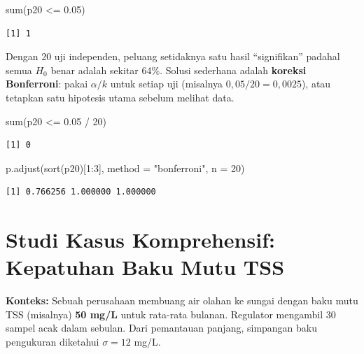 \documentclass[
  indonesian,
  letterpaper,
]{book}
\newenvironment{Shaded}{\begin{snugshade}}{\end{snugshade}}
\newcommand{\AttributeTok}[1]{\textcolor[rgb]{0.40,0.45,0.13}{#1}}
\newcommand{\DecValTok}[1]{\textcolor[rgb]{0.68,0.00,0.00}{#1}}
\newcommand{\FloatTok}[1]{\textcolor[rgb]{0.68,0.00,0.00}{#1}}
\newcommand{\FunctionTok}[1]{\textcolor[rgb]{0.28,0.35,0.67}{#1}}
\newcommand{\NormalTok}[1]{\textcolor[rgb]{0.00,0.23,0.31}{#1}}
\newcommand{\SpecialCharTok}[1]{\textcolor[rgb]{0.37,0.37,0.37}{#1}}
\newcommand{\StringTok}[1]{\textcolor[rgb]{0.13,0.47,0.30}{#1}}
\begin{document}
\begin{Shaded}
\begin{Highlighting}[]
\FunctionTok{sum}\NormalTok{(p20 }\SpecialCharTok{\textless{}=} \FloatTok{0.05}\NormalTok{)}
\end{Highlighting}
\end{Shaded}

\begin{verbatim}
[1] 1
\end{verbatim}

Dengan 20 uji independen, peluang setidaknya satu hasil ``signifikan''
padahal semua \(H_0\) benar adalah sekitar 64\%. Solusi sederhana adalah
\textbf{koreksi Bonferroni}: pakai \(\alpha/k\) untuk setiap uji
(misalnya \(0{,}05/20 = 0{,}0025\)), atau tetapkan satu hipotesis utama
sebelum melihat data.

\begin{Shaded}
\begin{Highlighting}[]
\FunctionTok{sum}\NormalTok{(p20 }\SpecialCharTok{\textless{}=} \FloatTok{0.05} \SpecialCharTok{/} \DecValTok{20}\NormalTok{)}
\end{Highlighting}
\end{Shaded}

\begin{verbatim}
[1] 0
\end{verbatim}

\begin{Shaded}
\begin{Highlighting}[]
\FunctionTok{p.adjust}\NormalTok{(}\FunctionTok{sort}\NormalTok{(p20)[}\DecValTok{1}\SpecialCharTok{:}\DecValTok{3}\NormalTok{], }\AttributeTok{method =} \StringTok{"bonferroni"}\NormalTok{, }\AttributeTok{n =} \DecValTok{20}\NormalTok{)}
\end{Highlighting}
\end{Shaded}

\begin{verbatim}
[1] 0.766256 1.000000 1.000000
\end{verbatim}

\section{Studi Kasus Komprehensif: Kepatuhan Baku Mutu
TSS}\label{studi-kasus-komprehensif-kepatuhan-baku-mutu-tss}

\textbf{Konteks:} Sebuah perusahaan membuang air olahan ke sungai dengan
baku mutu TSS (misalnya) \textbf{50 mg/L} untuk rata-rata bulanan.
Regulator mengambil 30 sampel acak dalam sebulan. Dari pemantauan
panjang, simpangan baku pengukuran diketahui \(\sigma = 12\) mg/L.
\end{document}
